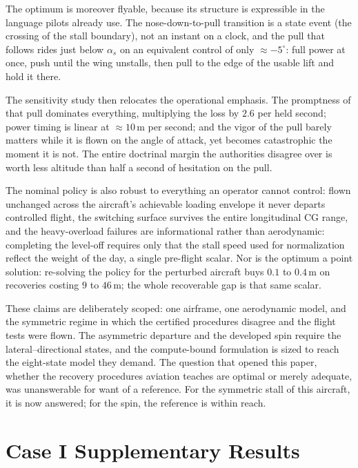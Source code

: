 \documentclass[journal ]{new-aiaa}
\begin{document}
The optimum is moreover flyable, because its structure is expressible
in the language pilots already use. The nose-down-to-pull transition
is a state event (the crossing of the stall boundary), not an
instant on a clock, and the pull that follows rides just below
$\alpha_s$ on an equivalent control of only $\approx -5^\circ$: full
power at once, push until the wing unstalls, then pull to the edge of
the usable lift and hold it there.

The sensitivity study then relocates the operational emphasis. The
promptness of that pull dominates everything, multiplying the loss
by $2.6$ per held second; power
timing is linear at $\approx 10$\,m per second; and the vigor of the
pull barely matters while it is flown on the angle of attack, yet
becomes catastrophic the moment it is not. The entire doctrinal
margin the authorities disagree over is worth less altitude than
half a second of hesitation on the pull.

The nominal policy is also robust to everything an operator cannot
control: flown unchanged across the aircraft's achievable loading
envelope it never departs controlled flight, the switching surface
survives the entire longitudinal CG range, and the heavy-overload
failures are informational rather than aerodynamic: completing the
level-off requires only that the stall speed used for normalization
reflect the weight of the day, a single pre-flight scalar. Nor is
the optimum a point solution: re-solving the policy for the
perturbed aircraft buys $0.1$ to $0.4$\,m on recoveries costing
$9$ to $46$\,m; the whole recoverable gap is that same scalar.

These claims are deliberately scoped: one airframe, one aerodynamic
model, and the symmetric regime in which the certified procedures
disagree and the flight tests were flown. The asymmetric departure
and the developed spin require the lateral--directional states, and
the compute-bound formulation is sized to reach the eight-state model
they demand. The question that opened this paper, whether the
recovery procedures aviation teaches are optimal or merely adequate,
was unanswerable for want of a reference. For the symmetric stall
of this aircraft, it is now answered; for the spin, the reference is
within reach.


\appendix

\section{Case I Supplementary Results}
\label{app:case1_baseline}
\end{document}
